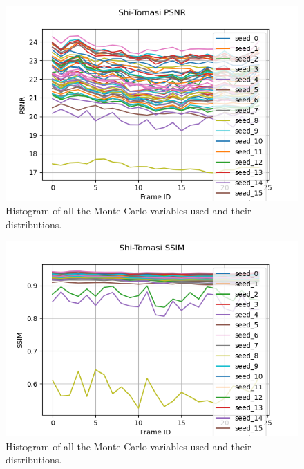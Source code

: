 \documentclass[11pt, conference, letterpaper]{IEEEtran}
\begin{document}
\begin{figure}[h]
    \centering
    \includegraphics[width=\linewidth]{mc_images/mc_stc_psnr.png}
    \caption{Histogram of all the Monte Carlo variables used and their distributions.}
    \label{fig:mc_stc_psnr}
\end{figure}

\begin{figure}[h]
    \centering
    \includegraphics[width=\linewidth]{mc_images/mc_stc_ssim.png}
    \caption{Histogram of all the Monte Carlo variables used and their distributions.}
    \label{fig:mc_stc_ssim}
\end{figure}
\end{document}
